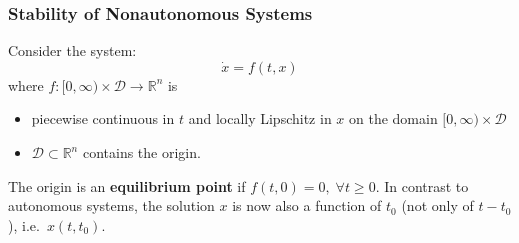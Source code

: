 \subsubsection{Stability of Nonautonomous Systems}
Consider the system:
\noindent\begin{equation*}
    \dot{x} = f(t, x)
\end{equation*}
where $f : [0, \infty) \times \mathcal{D} \to \mathbb{R}^n$ is  %
\begin{itemize}
    \item piecewise continuous in $t$ and locally Lipschitz in $x$ on the domain $[0, \infty) \times \mathcal{D}$  %
    \item $\mathcal{D}\subset \mathbb{R}^n$ contains the origin.
\end{itemize}
The origin is an \textbf{equilibrium point} if $f(t, 0) = 0, \; \forall t \geq 0$.
\newpar{}
In contrast to autonomous systems, the solution $x$ is now also a function of $t_0$ (not only of $t-t_0$), i.e.\ $x(t,t_0)$.

